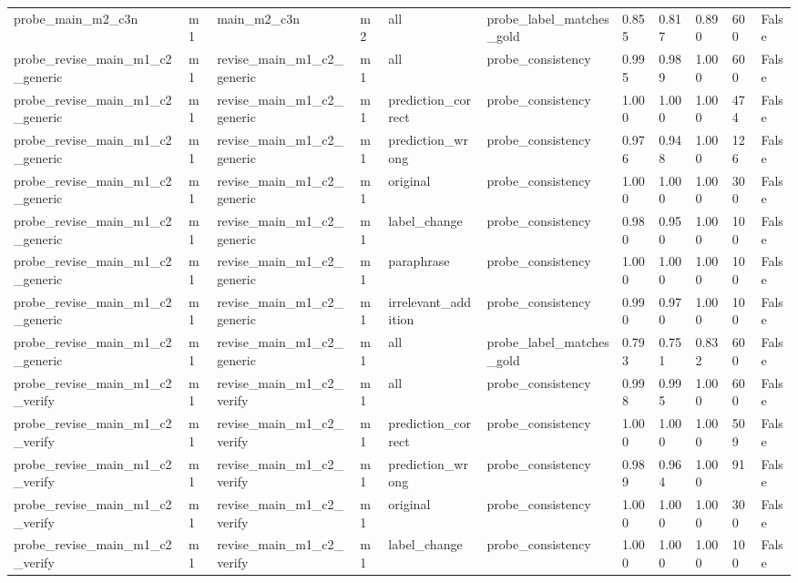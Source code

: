 \begin{tabular}{lllllllllll}
probe\_main\_m2\_c3n & m1 & main\_m2\_c3n & m2 & all & probe\_label\_matches\_gold & 0.855 & 0.817 & 0.890 & 600 & False \\
probe\_revise\_main\_m1\_c2\_generic & m1 & revise\_main\_m1\_c2\_generic & m1 & all & probe\_consistency & 0.995 & 0.989 & 1.000 & 600 & False \\
probe\_revise\_main\_m1\_c2\_generic & m1 & revise\_main\_m1\_c2\_generic & m1 & prediction\_correct & probe\_consistency & 1.000 & 1.000 & 1.000 & 474 & False \\
probe\_revise\_main\_m1\_c2\_generic & m1 & revise\_main\_m1\_c2\_generic & m1 & prediction\_wrong & probe\_consistency & 0.976 & 0.948 & 1.000 & 126 & False \\
probe\_revise\_main\_m1\_c2\_generic & m1 & revise\_main\_m1\_c2\_generic & m1 & original & probe\_consistency & 1.000 & 1.000 & 1.000 & 300 & False \\
probe\_revise\_main\_m1\_c2\_generic & m1 & revise\_main\_m1\_c2\_generic & m1 & label\_change & probe\_consistency & 0.980 & 0.950 & 1.000 & 100 & False \\
probe\_revise\_main\_m1\_c2\_generic & m1 & revise\_main\_m1\_c2\_generic & m1 & paraphrase & probe\_consistency & 1.000 & 1.000 & 1.000 & 100 & False \\
probe\_revise\_main\_m1\_c2\_generic & m1 & revise\_main\_m1\_c2\_generic & m1 & irrelevant\_addition & probe\_consistency & 0.990 & 0.970 & 1.000 & 100 & False \\
probe\_revise\_main\_m1\_c2\_generic & m1 & revise\_main\_m1\_c2\_generic & m1 & all & probe\_label\_matches\_gold & 0.793 & 0.751 & 0.832 & 600 & False \\
probe\_revise\_main\_m1\_c2\_verify & m1 & revise\_main\_m1\_c2\_verify & m1 & all & probe\_consistency & 0.998 & 0.995 & 1.000 & 600 & False \\
probe\_revise\_main\_m1\_c2\_verify & m1 & revise\_main\_m1\_c2\_verify & m1 & prediction\_correct & probe\_consistency & 1.000 & 1.000 & 1.000 & 509 & False \\
probe\_revise\_main\_m1\_c2\_verify & m1 & revise\_main\_m1\_c2\_verify & m1 & prediction\_wrong & probe\_consistency & 0.989 & 0.964 & 1.000 & 91 & False \\
probe\_revise\_main\_m1\_c2\_verify & m1 & revise\_main\_m1\_c2\_verify & m1 & original & probe\_consistency & 1.000 & 1.000 & 1.000 & 300 & False \\
probe\_revise\_main\_m1\_c2\_verify & m1 & revise\_main\_m1\_c2\_verify & m1 & label\_change & probe\_consistency & 1.000 & 1.000 & 1.000 & 100 & False \\

\end{tabular}
